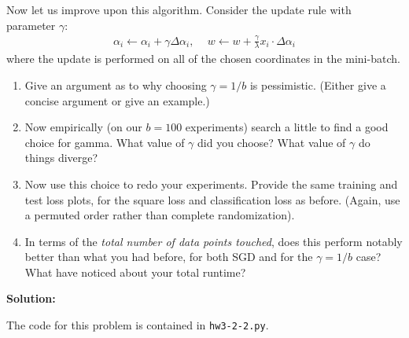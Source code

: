 \documentclass{article}
\newcommand{\solution}{\textbf{\vskip 0.2cm \large Solution:\\}}
\begin{document}
Now let us improve upon this algorithm. Consider the update rule with parameter $\gamma$:
\begin{align}
	\alpha_i \leftarrow \alpha_i+\gamma\Delta\alpha_i, \, \quad w \leftarrow
	w+\frac{\gamma}{\lambda}x_i \cdot \Delta\alpha_i
\end{align}
where the update is performed on all of the chosen coordinates in the mini-batch.


\begin{enumerate}
	\item Give an argument as to why choosing $\gamma=1/b$ is pessimistic. (Either give a concise argument or give an example.)
	\item Now empirically (on our $b=100$ experiments) search a little to find a good choice for gamma. What value of $\gamma$ did you choose? What value  of $\gamma$ do things diverge?
	\item  Now use this choice to redo your experiments. Provide the same training and test loss plots, for the square loss and classification loss as before. (Again, use a permuted order rather than complete randomization).
	\item In terms of the \emph{total number of data points touched}, does this perform notably better than what you had before, for both SGD and for the $\gamma=1/b$ case? What have noticed about your total runtime?
\end{enumerate}

\solution

The code for this problem is contained in {\tt hw3-2-2.py}.
\end{document}
